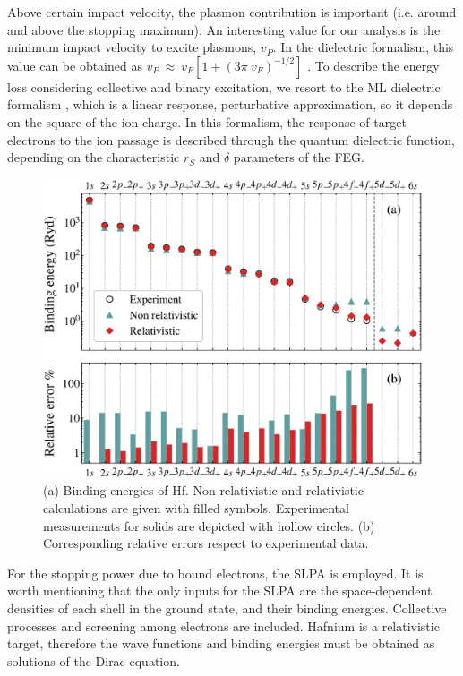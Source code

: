 \documentclass[aps,prb,reprint,groupedaddress]{revtex4-1}
\begin{document}
Above certain impact velocity, the plasmon contribution is important (i.e. around and above the stopping maximum). An interesting value for our analysis is the minimum impact velocity to excite
plasmons, $v_P$. In the dielectric formalism, this value can be obtained as $v_P\ \approx \ v_F[1+(3 \pi\ v_F)^{-1/2} ]$ \cite{suppression}. To describe the energy loss considering collective and binary excitation, we resort to the ML dielectric formalism \cite{Mermin}, which is a linear response, perturbative approximation, so it depends on the square of the ion charge. In this formalism, the response of target electrons to the ion passage is described through the quantum dielectric function, depending on the characteristic $r_S$ and $\delta$ parameters of the FEG. 

\begin{figure}[!t]
\centering
\includegraphics[width=11.cm]{Hf_bindener_bar.eps}
\caption{(a) Binding energies of Hf. Non relativistic and relativistic calculations are given with filled symbols.  Experimental measurements for solids\cite{williams1995} are depicted with hollow circles. (b) Corresponding relative errors respect to experimental data.}
\label{Binding_E}
\end{figure}

For the stopping power due to bound electrons, the SLPA \cite{mon17,mon13} is employed. It is worth mentioning that the only inputs for the SLPA are the space-dependent densities of each shell in the ground state, and their binding energies. Collective processes and screening among electrons are included. Hafnium is a relativistic target, therefore the wave functions and binding energies must be obtained as solutions of the Dirac equation.
\end{document}
